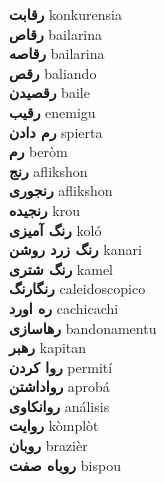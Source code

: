 \textbf{ رقابت  } konkurensia \\
\textbf{ رقاص  } bailarina \\
\textbf{ رقاصه  } bailarina \\
\textbf{ رقص  } baliando \\
\textbf{ رقصیدن  } baile \\
\textbf{ رقیب  } enemigu \\
\textbf{ رم دادن  } spierta \\
\textbf{ رم  } beròm \\
\textbf{ رنج  } aflikshon \\
\textbf{ رنجوری  } aflikshon \\
\textbf{ رنجیده  } krou \\
\textbf{ رنگ آمیزی  } koló \\
\textbf{ رنگ زرد روشن  } kanari \\
\textbf{ رنگ شتری  } kamel \\
\textbf{ رنگارنگ  } caleidoscopico \\
\textbf{ ره اورد  } cachicachi \\
\textbf{ رهاسازی  } bandonamentu \\
\textbf{ رهبر  } kapitan \\
\textbf{ روا کردن  } permití \\
\textbf{ رواداشتن  } aprobá \\
\textbf{ روانکاوی  } análisis \\
\textbf{ روایت  } kòmplòt \\
\textbf{ روبان  } brazièr \\
\textbf{ روباه صفت  } bispou \\
